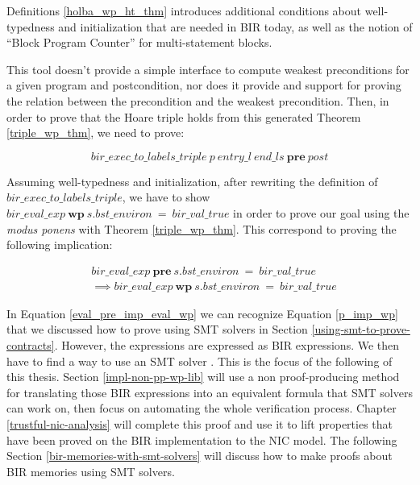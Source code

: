 \documentclass{kththesis}
\begin{document}
{Definitions \ref{holba_wp_ht_thm} introduces additional conditions about well-typedness and initialization that are needed in BIR today\footnotemark, as well as the notion of ``Block Program Counter'' for multi-statement blocks. %


This tool doesn't provide a simple interface to compute weakest preconditions for a given program and postcondition, nor does it provide and support for proving the relation between the precondition and the weakest precondition. Then, in order to prove that the Hoare triple holds from this generated Theorem \ref{triple_wp_thm}, we need to prove:

\begin{equation} 
    bir\_exec\_to\_labels\_triple~p~entry\_l~end\_ls~\mathbf{pre}~post
    \label{triple_pre_thm}
\end{equation}

Assuming well-typedness and initialization, after rewriting the definition of $bir\_exec\_to\_labels\_triple$, we have to show $bir\_eval\_exp~\mathbf{wp}~s.bst\_environ~=~bir\_val\_true$ in order to prove our goal using the \textit{modus ponens} with Theorem \ref{triple_wp_thm}. This correspond to proving the following implication:

\begin{small}
    \begin{equation}
        \begin{split}
            &bir\_eval\_exp~\mathbf{pre}~s.bst\_environ~=~bir\_val\_true\\
            &\implies bir\_eval\_exp~\mathbf{wp}~s.bst\_environ~=~bir\_val\_true
        \end{split}
        \label{eval_pre_imp_eval_wp}
    \end{equation}
\end{small}

In Equation \ref{eval_pre_imp_eval_wp} we can recognize Equation \ref{p_imp_wp} that we discussed how to prove using \gls{SMT} solvers in Section \ref{using-smt-to-prove-contracts}. However, the expressions are expressed as BIR expressions. We then have to find a way to use an SMT solver \footnotemark. This is the focus of the following of this thesis. Section \ref{impl-non-pp-wp-lib} will use a non \gls{proof-producing} method for translating those BIR expressions into an equivalent formula that SMT solvers can work on, then focus on automating the whole verification process. Chapter \ref{trustful-nic-analysis} will complete this proof and use it to lift properties that have been proved on the BIR implementation to the \gls{NIC} model. The following Section \ref{bir-memories-with-smt-solvers} will discuss how to make proofs about BIR memories using \gls{SMT} solvers.

}
\end{document}
